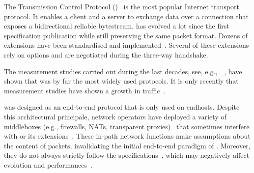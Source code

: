 
The Transmission Control Protocol (\tcp)~\cite{rfc793} is the most popular
Internet transport protocol. It enables a client and a server to exchange data
over a connection that exposes a bidirectional reliable bytestream. \tcp has
evolved a lot since the first specification publication while still preserving
the same packet format. Dozens of \tcp extensions have been standardised and
implemented~\cite{RFC7414}. Several of these extensions rely on \tcp options and
are negotiated during the three-way handshake.

The measurement studies carried out during the last decades, see,
e.g.,~ \cite{paxson1994growth,claffy1993traffic,maier2009dominant,trevisan2020five},
have shown that \tcp was by far the most widely used protocols. It is only
recently that measurement studies have shown a growth in \udp
traffic~\cite{trevisan2020five}.



\tcp was designed as an end-to-end protocol that is only used on endhosts.
Despite this architectural principale, network operators have deployed a variety
of middleboxes (e.g., firewalls, NATs, transparent proxies)~\cite{mCloud} that
sometimes interfere with \tcp or its extensions~\cite{medina2004measuring,
honda2011still, edeline2019bottom}.  These in-path network functions make
assumptions about the content of \tcp packets, invalidating the initial
end-to-end paradigm of \tcp. Moreover, they do not always strictly follow the
\tcp specifications~\cite{honda2011still, hesmans2013tcp}, which may negatively
affect \tcp evolution and performances~\cite{edeline2020evaluating}.





